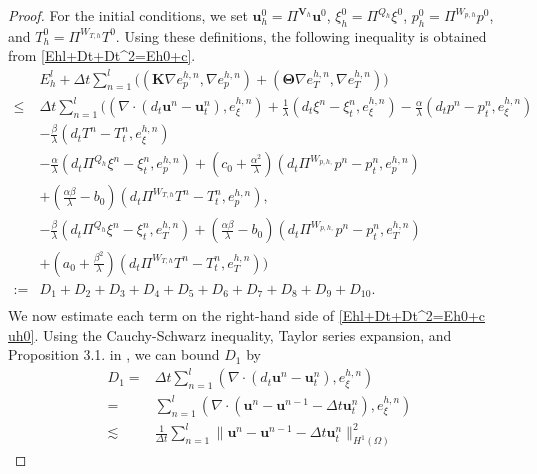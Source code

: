 \documentclass{article}
\numberwithin{equation}{section}
\begin{document}
\begin{proof}
For the initial conditions, we set  
\(\bm u_h^0 = \Pi^{\bm V_h} \bm u^0\), \(\xi_h^0 = \Pi^{Q_h} \xi^0\), \(p_h^0 = \Pi^{W_{p,h}} p^0\), and \(T_h^0 = \Pi^{W_{T,h}} T^0\).  
Using these definitions, the following inequality is obtained from \eqref{Ehl+Dt+Dt^2=Eh0+c}.
\begin{equation}\label{Ehl+Dt+Dt^2=Eh0+c uh0}
\begin{aligned} 
 & E_h^l + \Delta t \sum_{n=1}^l \big(  (\bm K\nabla e_p^{h,n},\nabla  e_p^{h,n})
                              +  (\bm\Theta\nabla e_T^{h,n},\nabla  e_T^{h,n})  \big) \\
 \le&  \Delta t \sum_{n=1}^l\Big( (\nabla\cdot (d_t\bm u^n- \bm u_t^n ), e_{\xi}^{h,n})
    +\frac{1}{\lambda}(d_t\xi^n- \xi_t^n, e_{\xi}^{h,n})
   -\frac{\alpha}{\lambda}( d_tp^n- p_t^n, e_{\xi}^{h,n})\\
  & -\frac{\beta}{\lambda}(d_tT^n- T_t^n, e_{\xi}^{h,n})\\
  &-\frac\alpha\lambda(d_t\Pi^{Q_h} \xi^n- \xi_t^n , e_p^{h,n})
  +(c_0+\frac{\alpha^2}{\lambda})(d_t\Pi^{W_{p,h,}}p^n- p_t^n , e_p^{h,n}) \\
&+ (\frac{\alpha\beta}{\lambda}-b_0)(d_t\Pi^{W_{T,h}}T^n - T_t^n, e_p^{h,n}) ,\\
  &-\frac\beta\lambda(d_t\Pi^{Q_h} \xi^n- \xi_t^n, e_T^{h,n})
+(\frac{\alpha\beta}{\lambda}-b_0)(d_t\Pi^{W_{p,h,}}p^n- p_t^n, e_T^{h,n})\\
 &+(a_0+\frac{\beta^2}{\lambda})(d_t\Pi^{W_{T,h}}T^n - T_t^n, e_T^{h,n}) \Big)\\  
 :=&D_1+D_2 +D_3 +D_4 +D_5 +D_6 +D_7 +D_8 +D_9 +D_{10}.  \\                                  
\end{aligned}
\end{equation} 
We now estimate each term on the right-hand side of \eqref{Ehl+Dt+Dt^2=Eh0+c uh0}.
Using the Cauchy-Schwarz inequality, Taylor series expansion, and Proposition 3.1. in \cite{gu2023priori}, we can bound
$D_1$ by
   \begin{equation*}    
\begin{aligned} 
 D_1= &\Delta t \sum_{n=1}^l   (\nabla\cdot (d_t\bm u^n- \bm u_t^n ), e_{\xi}^{h,n}) \\
 =& \sum_{n=1}^l  (\nabla\cdot (\bm u^n-\bm u^{n-1}-\Delta t \bm u_t^n ), e_{\xi}^{h,n})\\                             
 \lesssim& \frac{1}{\Delta t}   \sum_{n=1}^l 
        \| \bm u^n-\bm u^{n-1}-\Delta t \bm u_t^n  \|_{H^1(\Omega)}^2

\end{aligned}
\end{equation*}
\end{proof}
\end{document}

